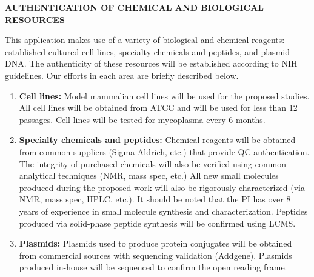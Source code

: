 \documentclass{F32}
\begin{document}
\begin{center}
{\bf AUTHENTICATION OF CHEMICAL AND BIOLOGICAL RESOURCES}
\end{center}

This application makes use of a variety of biological and chemical reagents: established cultured cell lines, specialty chemicals and peptides, and plasmid DNA. The authenticity of these resources will be established according to NIH guidelines. Our efforts in each area are briefly described below.

\begin{enumerate}
  \item {\bf Cell lines:} Model mammalian cell lines will be used for the proposed studies. All cell lines will be obtained from ATCC and will be used for less than 12 passages. Cell lines will be tested for mycoplasma every 6 months.
  \item {\bf Specialty chemicals and peptides:} Chemical reagents will be obtained from common suppliers (Sigma Aldrich, etc.) that provide QC authentication.  The integrity of purchased chemicals will also be verified using common analytical techniques (NMR, mass spec, etc.)  All new small molecules produced during the proposed work will also be rigorously characterized (via NMR, mass spec, HPLC, etc.).  It should be noted that the PI has over 8 years of experience in small molecule synthesis and characterization.
  Peptides produced via solid-phase peptide synthesis will be confirmed using LCMS.
  \item {\bf Plasmids:} Plasmids used to produce protein conjugates will be obtained from commercial sources with sequencing validation (Addgene). Plasmids produced in-house will be sequenced to confirm the open reading frame.
\end{enumerate}

\end{document}
